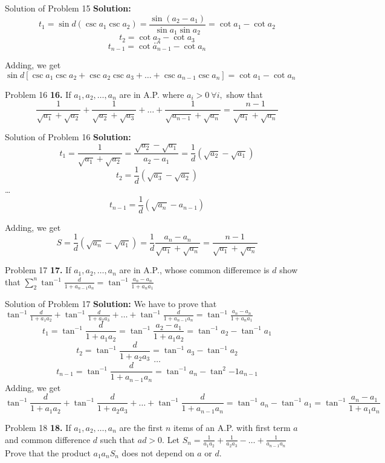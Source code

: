 \documentclass[aspectratio=1610,8pt]{beamer}
\begin{document}
\begin{frame}{Solution of Problem 15}
  \textbf{Solution:}$$t_1 = \sin d(\csc a_1\csc a_2) = \frac{\sin(a_2 - a_1)}{\sin a_1\sin a_2} = \cot a_1 - \cot a_2$$
  $$t_2 = \cot a_2 - \cot a_3$$
  $$\ldots$$
  $$t_{n - 1} = \cot a_{n - 1} - \cot a_n$$

  Adding, we get $\sin d[\csc a_1\csc a_2 + \csc a_2\csc a_3 + \ldots + \csc a_{n - 1}\csc a_n] = \cot a_1 - \cot a_n$
\end{frame}
\begin{frame}{Problem 16}
  \textbf{16.} If $a_1, a_2, \ldots, a_n$ are in A.P. where $a_i > 0~\forall i,$ show that $$\frac{1}{\sqrt{a_1} + \sqrt{a_2}} +
  \frac{1}{\sqrt{a_2} + \sqrt{a_3}} + \ldots + \frac{1}{\sqrt{a_{n - 1}} + \sqrt{a_n}} = \frac{n - 1}{\sqrt{a_1} + \sqrt{a_n}}$$
\end{frame}
\begin{frame}{Solution of Problem 16}
  \textbf{Solution:} $$t_1 = \frac{1}{\sqrt{a_1} + \sqrt{a_2}} = \frac{\sqrt{a_2} - \sqrt{a_1}}{a_2 - a_1} =
  \frac{1}{d}(\sqrt{a_2} - \sqrt{a_1})$$
  $$t_2 = \frac{1}{d}(\sqrt{a_3} - \sqrt{a_2})$$
  \ldots
  $$t_{n - 1} = \frac{1}{d}(\sqrt{a_n} - a_{n - 1})$$

  Adding, we get $$S = \frac{1}{d}(\sqrt{a_n} - \sqrt{a_1}) = \frac{1}{d}\frac{a_n - a_n}{\sqrt{a_1} + \sqrt{a_n}} = \frac{n -
    1}{\sqrt{a_1} + \sqrt{a_n}}$$
\end{frame}
\begin{frame}{Problem 17}
  \textbf{17.} If $a_1, a_2, \ldots, a_n$ are in A.P., whose common differemce is $d$ show that $\sum_{2}^n\tan^{-1}\frac{d}{1 +
    a_{n - 1}a_n} = \tan^{-1}\frac{a_n - a_n}{1 + a_na_1}$
\end{frame}
\begin{frame}{Solution of Problem 17}
  \textbf{Solution:} We have to prove that $\tan^{-1}\frac{d}{1 + a_1a_2} + \tan^{-1}\frac{d}{1 + a_2a_3} + \ldots +
  \tan^{-1}\frac{d}{1 + a_{n - 1}a_n} = \tan^{-1}\frac{a_n - a_n}{1 + a_na_1}$
  $$t_1 = \tan^{-1}\frac{d}{1 + a_1a_2} = \tan^{-1}\frac{a_2 - a_1}{1 + a_1a_2} = \tan^{-1}a_2 - \tan^{-1}a_1$$
  $$t_2 = \tan^{-1}\frac{d}{1 + a_2a_3} = \tan^{-1}a_3 - \tan^{-1}a_2$$
  $$\ldots$$
  $$t_{n - 1} = \tan^{-1}\frac{d}{1 + a_{n - 1}a_n} = \tan^{-1}a_{n} - \tan^2{-1}a_{n - 1}$$
  Adding, we get
  $$\tan^{-1}\frac{d}{1 + a_1a_2} + \tan^{-1}\frac{d}{1 + a_2a_3} + \ldots + \tan^{-1}\frac{d}{1 + a_{n - 1}a_n} = \tan^{-1}a_n -
  \tan^{-1}a_1 = \tan^{-1}\frac{a_n - a_1}{1 + a_1a_n}$$
\end{frame}
\begin{frame}{Problem 18}
  \textbf{18.} If $a_1, a_2, \ldots, a_n$ are the first $n$ items of an A.P. with first term $a$ and common difference $d$ such
  that $ad > 0.$ Let $S_n = \frac{1}{a_1a_2} + \frac{1}{a_2a_3} - \ldots + \frac{1}{a_{n - 1}a_n}$ Prove that the product
  $a_1a_nS_n$ does not depend on $a$ or $d.$
\end{frame}
\end{document}
